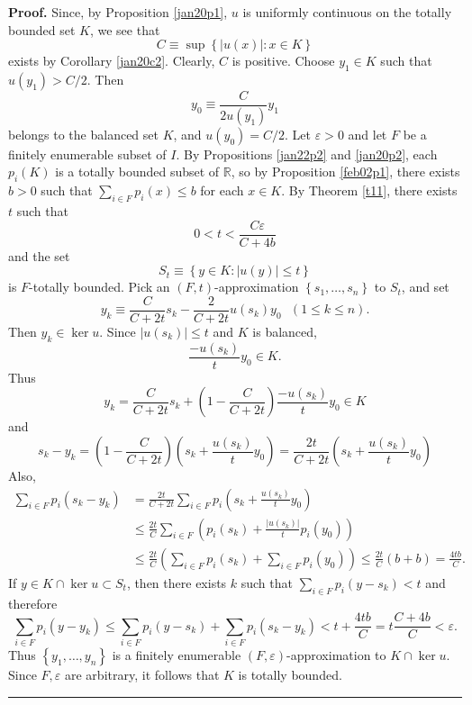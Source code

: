 \documentclass{article}%
\newenvironment{proof}[1][Proof]{\noindent\textbf{#1.} }{\ \rule{0.5em}{0.5em}}
\begin{document}
\begin{proof}
Since, by Proposition \ref{jan20p1}, $u$ is uniformly continuous on the
totally bounded set $K$, we see that%
\[
C\equiv\sup\left\{  \left\vert u(x)\right\vert :x\in K\right\}
\]
exists by Corollary \ref{jan20c2}. Clearly, $C$ is positive. Choose $y_{1}\in
K$ such that $u(y_{1})>C/2$. Then%
\[
y_{0}\equiv\frac{C}{2u(y_{1})}y_{1}%
\]
belongs to the balanced set $K$, and $u(y_{0})=C/2$. Let $\varepsilon>0$ and
let $F$ be a finitely enumerable subset of $I$. By Propositions \ref{jan22p2}
and \ref{jan20p2}, each $p_{i}(K)$ is a totally bounded subset of $\mathbb{R}%
$, so by Proposition \ref{feb02p1}, there exists $b>0$ such that $\sum_{i\in
F}p_{i}(x)\leq b$ for each $x\in K$. By Theorem \ref{t11}, there exists $t$
such that%
\[
0<t<\frac{C\varepsilon}{C+4b}%
\]
and the set%
\[
S_{t}\equiv\left\{  y\in K:\left\vert u(y)\right\vert \leq t\right\}
\]
is $F$-totally bounded. Pick an $\left(  F,t\right)  $-approximation $\left\{
s_{1},\ldots,s_{n}\right\}  $ to $S_{t}$, and set%
\[
y_{k}\equiv\frac{C}{C+2t}s_{k}-\frac{2}{C+2t}u(s_{k})y_{0}\ \ \ \left(  1\leq
k\leq n\right)  .
\]
Then $y_{k}\in\ker u$. Since $\left\vert u(s_{k})\right\vert \leq t$ and $K$
is balanced,%
\[
\frac{-u(s_{k})}{t}y_{0}\in K.
\]
Thus%
\[
y_{k}=\frac{C}{C+2t}s_{k}+\left(  1-\frac{C}{C+2t}\right)  \frac{-u(s_{k})}%
{t}y_{0}\in K
\]
and%
\[
s_{k}-y_{k}=\left(  1-\frac{C}{C+2t}\right)  \left(  s_{k}+\frac{u(s_{k})}%
{t}y_{0}\right)  =\frac{2t}{C+2t}\left(  s_{k}+\frac{u(s_{k})}{t}y_{0}\right)
\]
Also,%
\begin{align*}
\sum_{i\in F}p_{i}(s_{k}-y_{k}) &  =\frac{2t}{C+2t}\sum_{i\in F}p_{i}\left(
s_{k}+\frac{u(s_{k})}{t}y_{0}\right)  \\
&  \leq\frac{2t}{C}\sum_{i\in F}\left(  p_{i}(s_{k})+\frac{\left\vert
u(s_{k})\right\vert }{t}p_{i}(y_{0})\right)  \\
&  \leq\frac{2t}{C}\left(  \sum_{i\in F}p_{i}(s_{k})+\sum_{i\in F}p_{i}%
(y_{0})\right)  \leq\frac{2t}{C}(b+b)=\frac{4tb}{C}.
\end{align*}
If $y\in K\cap\ker u\subset S_{t}$, then there exists $k$ such that
$\sum_{i\in F}p_{i}(y-s_{k})<t$ and therefore%
\[
\sum_{i\in F}p_{i}(y-y_{k})\leq\sum_{i\in F}p_{i}(y-s_{k})+\sum_{i\in F}%
p_{i}(s_{k}-y_{k})<t+\frac{4tb}{C}=t\frac{C+4b}{C}<\varepsilon.
\]
Thus $\left\{  y_{1},\ldots,y_{n}\right\}  $ is a finitely enumerable $\left(
F,\varepsilon\right)  $-approximation to $K\cap\ker u$. Since $F,\varepsilon$
are arbitrary, it follows that $K$ is totally bounded.
\end{proof}
\end{document}
